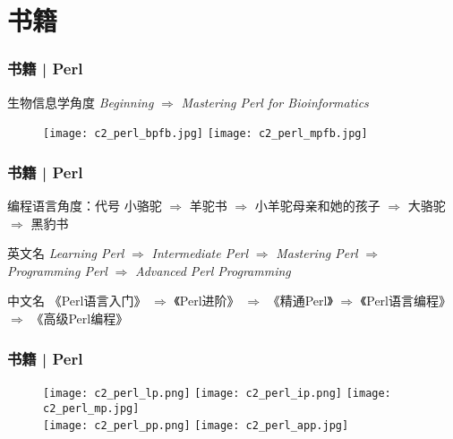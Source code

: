 \section{书籍}
\begin{frame}
  \frametitle{书籍 | Perl}
  \begin{block}{生物信息学角度}
    \textit{Beginning} $\Longrightarrow$ \textit{Mastering Perl for Bioinformatics}
  \end{block}
  \begin{figure}
    \centering
    \texttt{[image: c2\_perl\_bpfb.jpg]}
    \hspace{1em}
    \texttt{[image: c2\_perl\_mpfb.jpg]}
  \end{figure}
\end{frame}

\begin{frame}
  \frametitle{书籍 | Perl}
  \begin{block}{编程语言角度：代号}
小骆驼 $\Rightarrow$ 羊驼书 $\Rightarrow$ 小羊驼母亲和她的孩子 $\Rightarrow$ 大骆驼 $\Rightarrow$ 黑豹书
  \end{block}
  \pause
  \begin{block}{英文名}
    \textit{Learning Perl} $\Rightarrow$ \textit{Intermediate Perl} $\Rightarrow$ \textit{Mastering Perl} $\Rightarrow$ \textit{Programming Perl} $\Rightarrow$ \textit{Advanced Perl Programming}
  \end{block}
  \pause
  \begin{block}{中文名}
    《Perl语言入门》 $\Rightarrow$ 《Perl进阶》 $\Rightarrow$ 《精通Perl》 $\Rightarrow$ 《Perl语言编程》 $\Rightarrow$ 《高级Perl编程》
  \end{block}
  \pause
\end{frame}

\begin{frame}
  \frametitle{书籍 | Perl}
  \begin{figure}
    \centering
    \texttt{[image: c2\_perl\_lp.png]}
    \qquad
    \texttt{[image: c2\_perl\_ip.png]}
    \qquad
    \texttt{[image: c2\_perl\_mp.jpg]}\\
    \texttt{[image: c2\_perl\_pp.png]}
    \hspace{2cm}
    \texttt{[image: c2\_perl\_app.jpg]}
  \end{figure}
\end{frame}

